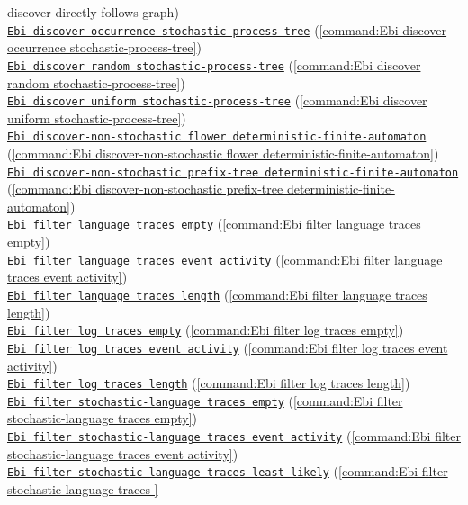 {discover directly-follows-graph})\\\null\qquad\hyperref[command:Ebi discover occurrence stochastic-process-tree]{\texttt{Ebi discover occurrence stochastic-process-tree}} (\cref{command:Ebi discover occurrence stochastic-process-tree})\\\null\qquad\hyperref[command:Ebi discover random stochastic-process-tree]{\texttt{Ebi discover random stochastic-process-tree}} (\cref{command:Ebi discover random stochastic-process-tree})\\\null\qquad\hyperref[command:Ebi discover uniform stochastic-process-tree]{\texttt{Ebi discover uniform stochastic-process-tree}} (\cref{command:Ebi discover uniform stochastic-process-tree})\\\null\qquad\hyperref[command:Ebi discover-non-stochastic flower deterministic-finite-automaton]{\texttt{Ebi discover-non-stochastic flower deterministic-finite-automaton}} (\cref{command:Ebi discover-non-stochastic flower deterministic-finite-automaton})\\\null\qquad\hyperref[command:Ebi discover-non-stochastic prefix-tree deterministic-finite-automaton]{\texttt{Ebi discover-non-stochastic prefix-tree deterministic-finite-automaton}} (\cref{command:Ebi discover-non-stochastic prefix-tree deterministic-finite-automaton})\\\null\qquad\hyperref[command:Ebi filter language traces empty]{\texttt{Ebi filter language traces empty}} (\cref{command:Ebi filter language traces empty})\\\null\qquad\hyperref[command:Ebi filter language traces event activity]{\texttt{Ebi filter language traces event activity}} (\cref{command:Ebi filter language traces event activity})\\\null\qquad\hyperref[command:Ebi filter language traces length]{\texttt{Ebi filter language traces length}} (\cref{command:Ebi filter language traces length})\\\null\qquad\hyperref[command:Ebi filter log traces empty]{\texttt{Ebi filter log traces empty}} (\cref{command:Ebi filter log traces empty})\\\null\qquad\hyperref[command:Ebi filter log traces event activity]{\texttt{Ebi filter log traces event activity}} (\cref{command:Ebi filter log traces event activity})\\\null\qquad\hyperref[command:Ebi filter log traces length]{\texttt{Ebi filter log traces length}} (\cref{command:Ebi filter log traces length})\\\null\qquad\hyperref[command:Ebi filter stochastic-language traces empty]{\texttt{Ebi filter stochastic-language traces empty}} (\cref{command:Ebi filter stochastic-language traces empty})\\\null\qquad\hyperref[command:Ebi filter stochastic-language traces event activity]{\texttt{Ebi filter stochastic-language traces event activity}} (\cref{command:Ebi filter stochastic-language traces event activity})\\\null\qquad\hyperref[command:Ebi filter stochastic-language traces least-likely]{\texttt{Ebi filter stochastic-language traces least-likely}} (\cref{command:Ebi filter stochastic-language traces }
